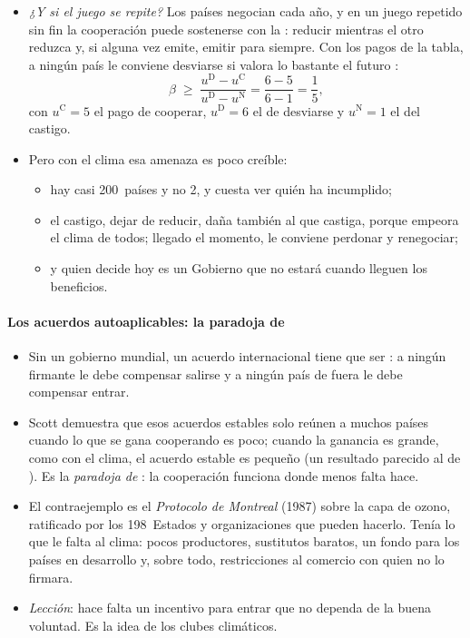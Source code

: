 \documentclass[11pt]{article}
\begin{document}
\begin{itemize}
\item \emph{¿Y si el juego se repite?} Los países negocian cada año, y en un juego repetido sin fin la cooperación puede sostenerse con la : reducir mientras el otro reduzca y, si alguna vez emite, emitir para siempre. Con los pagos de la tabla, a ningún país le conviene desviarse si valora lo bastante el futuro :
  \[
  \beta\;\geq\;\frac{u^{\mathrm{D}}-u^{\mathrm{C}}}{u^{\mathrm{D}}-u^{\mathrm{N}}}=\frac{6-5}{6-1}=\frac{1}{5},
  \]
  con $u^{\mathrm C}=5$ el pago de cooperar, $u^{\mathrm D}=6$ el de desviarse y $u^{\mathrm N}=1$ el del castigo.
\item Pero con el clima esa amenaza es poco creíble:
  \begin{itemize}
  \item hay casi 200~países y no 2, y cuesta ver quién ha incumplido;
  \item el castigo, dejar de reducir, daña también al que castiga, porque empeora el clima de todos; llegado el momento, le conviene perdonar y renegociar;
  \item y quien decide hoy es un Gobierno que no estará cuando lleguen los beneficios.
  \end{itemize}
\end{itemize}

\paragraph{Los acuerdos autoaplicables: la paradoja de }

\begin{itemize}
\item Sin un gobierno mundial, un acuerdo internacional tiene que ser : a ningún firmante le debe compensar salirse y a ningún país de fuera le debe compensar entrar.
\item Scott \textcite{Barrett1994Self} demuestra que esos acuerdos estables solo reúnen a muchos países cuando lo que se gana cooperando es poco; cuando la ganancia es grande, como con el clima, el acuerdo estable es pequeño (un resultado parecido al de \textcite{CarraroSiniscalco1993Strategies}). Es la \emph{paradoja de }: la cooperación funciona donde menos falta hace.
\item El contraejemplo es el \emph{Protocolo de Montreal} (1987) sobre la capa de ozono, ratificado por los 198~Estados y organizaciones que pueden hacerlo\nocite{ONU1987Montreal}. Tenía lo que le falta al clima: pocos productores, sustitutos baratos, un fondo para los países en desarrollo y, sobre todo, restricciones al comercio con quien no lo firmara\nocite{Barrett2003Environment}.
\item \emph{Lección}: hace falta un incentivo para entrar que no dependa de la buena voluntad. Es la idea de los clubes climáticos.
\end{itemize}
\end{document}
